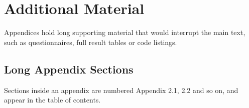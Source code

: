 \chapter{Additional Material}
\label{app:extra}

Appendices hold long supporting material that would interrupt the main text, such as
questionnaires, full result tables or code listings.

\section{Long Appendix Sections}
Sections inside an appendix are numbered Appendix 2.1, 2.2 and so on, and appear in the
table of contents.

